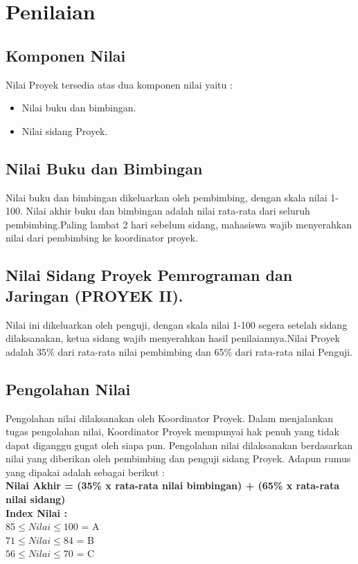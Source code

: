 \section{Penilaian}
\subsection{Komponen	Nilai}
Nilai	Proyek	tersedia	atas	dua	komponen	nilai yaitu	:
\begin{itemize}
	\item Nilai	buku	dan	bimbingan.
	\item Nilai	sidang Proyek.
\end{itemize}

\subsection{Nilai	Buku	dan	Bimbingan}
Nilai	buku	dan	bimbingan	dikeluarkan	oleh	pembimbing,	dengan	skala	nilai	1-100. Nilai	
akhir	buku	dan	bimbingan	adalah	nilai	rata-rata	dari	seluruh	pembimbing.Paling	lambat	2	
hari	 sebelum	 sidang,	 mahasiswa	 wajib	 menyerahkan	 nilai	 dari	 pembimbing	 ke	
koordinator	proyek.

\subsection{Nilai	Sidang Proyek	Pemrograman	dan	Jaringan (PROYEK	II).}
Nilai	 ini	 dikeluarkan	 oleh	 penguji,	 dengan	 skala	 nilai	 1-100	 segera	 setelah	 sidang
dilaksanakan,	 ketua	 sidang wajib	 menyerahkan	 hasil	 penilaiannya.Nilai	 Proyek	 adalah	
35\%	dari	rata-rata	nilai	pembimbing	dan	65\%	dari	rata-rata	nilai	Penguji.

\subsection{Pengolahan	Nilai}
Pengolahan	 nilai	 dilaksanakan	 oleh	 Koordinator	 Proyek.	 Dalam	 menjalankan	 tugas	pengolahan	nilai,	Koordinator	Proyek	mempunyai	hak	penuh	 yang	 tidak	dapat	diganggu	
gugat	 oleh	 siapa	 pun.	 Pengolahan	 nilai	 dilaksanakan	 berdasarkan	 nilai	 yang	 diberikan	
oleh	pembimbing	dan	penguji	sidang Proyek.	Adapun	rumus	yang	dipakai	adalah	sebagai	
berikut	: \\

\textbf{Nilai	Akhir	=			(35\%	x	rata-rata	nilai	bimbingan)	+	(65\% x	rata-rata	nilai	sidang)	} \\

\textbf{Index Nilai :} \\
$85	\leq Nilai	\leq 100$	= A \\
$71	\leq Nilai	\leq 84$	= B \\
$56	\leq Nilai	\leq 70	$	= C \\

